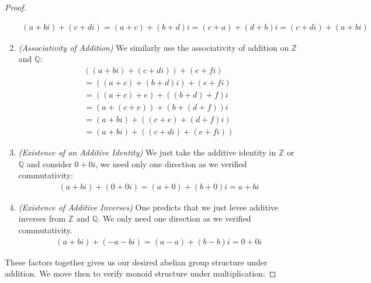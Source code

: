 \documentclass[12pt]{article}
\newenvironment{sol}[1][Solution]{\begin{trivlist}
\item[\hskip \labelsep {\bfseries #1:}]}{\end{trivlist}}
\begin{document}
\begin{sol}
\begin{proof}
\begin{enumerate}
\begin{equation}
                \begin{aligned}
                    (a + bi) + (c + di) = (a + c) + (b + d)i = (c + a) + (d + b)i = (c + di) + (a + bi)
                \end{aligned}
            \end{equation}
            \item \textit{(Associativity of Addition)}
            We similarly use the associativity of addition on $\mathbb{Z}$ and $\mathbb{Q}$:
            \begin{equation}
                \begin{aligned} 
                    ((a + bi) + (c + di)) + (e + fi) 
                    \\ = ((a + c) + (b + d)i) + (e + fi)
                    \\ = ((a + c) + e) + ((b + d) + f)i
                    \\ =  (a + (c + e)) + (b + (d + f))i 
                    \\ = (a + bi) + ((c + e) + (d + f)i)
                    \\ = (a + bi) + ((c + di) + (e + fi))
                \end{aligned}
            \end{equation}
            \item \textit{(Existence of an Additive Identity)}
            We just take the additive identity in $\mathbb{Z}$ or $\mathbb{Q}$ and consider $0 + 0i$, we need only one direction as we verified commutativity:
            \begin{equation}
                \begin{aligned}
                    (a + bi) + (0 + 0i) = (a + 0) + (b + 0)i = a + bi
                \end{aligned}
            \end{equation}
            \item \textit{(Existence of Additive Inverses)}
            One predicts that we just levee additive inverses from $\mathbb{Z}$ and $\mathbb{Q}$. We only need one direction as we verified commutativity.
            \begin{equation}
                \begin{aligned}
                    (a + bi) + (-a -bi) = (a - a) + (b - b)i = 0 + 0i
                \end{aligned}
            \end{equation}
        \end{enumerate}
        These factors together gives us our desired abelian group structure under addition. We move then to verify monoid structure under multiplication:

\end{proof}
\end{sol}
\end{document}
